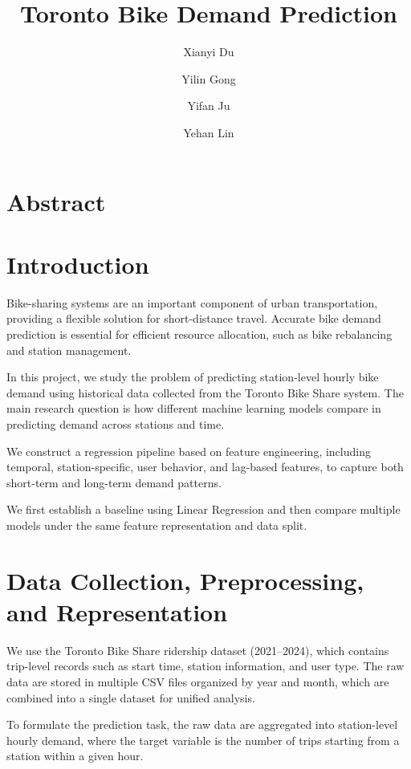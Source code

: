 \documentclass[11pt]{article}
\title{\vspace{-1em}\textbf{Toronto Bike Demand Prediction}\vspace{-0.5em}}
\author{
Xianyi Du \and
Yilin Gong \and
Yifan Ju \and
Yehan Lin
}
\date{}
\begin{document}
\maketitle
\vspace{-1em}

\section{Abstract}

\section{Introduction}

Bike-sharing systems are an important component of urban transportation, providing a flexible solution for short-distance travel. Accurate bike demand prediction is essential for efficient resource allocation, such as bike rebalancing and station management.

In this project, we study the problem of predicting station-level hourly bike demand using historical data collected from the Toronto Bike Share system. The main research question is how different machine learning models compare in predicting demand across stations and time.

We construct a regression pipeline based on feature engineering, including temporal, station-specific, user behavior, and lag-based features, to capture both short-term and long-term demand patterns.

We first establish a baseline using Linear Regression and then compare multiple models under the same feature representation and data split.


\section{Data Collection, Preprocessing, and Representation}

We use the Toronto Bike Share ridership dataset (2021--2024), which contains trip-level records such as start time, station information, and user type. The raw data are stored in multiple CSV files organized by year and month, which are combined into a single dataset for unified analysis.

To formulate the prediction task, the raw data are aggregated into station-level hourly demand, where the target variable is the number of trips starting from a station within a given hour.
\end{document}

